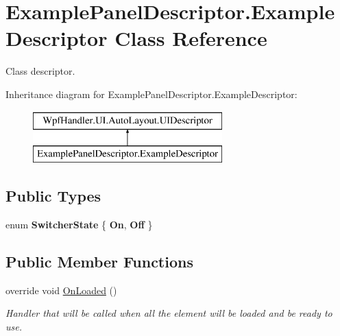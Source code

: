 \hypertarget{class_example_panel_descriptor_1_1_example_descriptor}{}\section{Example\+Panel\+Descriptor.\+Example\+Descriptor Class Reference}
\label{class_example_panel_descriptor_1_1_example_descriptor}


Class descriptor.  


Inheritance diagram for Example\+Panel\+Descriptor.\+Example\+Descriptor\+:\begin{figure}[H]
\begin{center}
\leavevmode
\includegraphics[height=2.000000cm]{d2/d6f/class_example_panel_descriptor_1_1_example_descriptor}
\end{center}
\end{figure}
\subsection*{Public Types}
\begin{DoxyCompactItemize}
\item 
\mbox{\label{class_example_panel_descriptor_1_1_example_descriptor_aa23179dbe0667185d4f11121a9e06fac}} 
enum {\bfseries Switcher\+State} \{ {\bfseries On}, 
{\bfseries Off}
 \}
\end{DoxyCompactItemize}
\subsection*{Public Member Functions}
\begin{DoxyCompactItemize}
\item 
override void \mbox{\hyperlink{class_example_panel_descriptor_1_1_example_descriptor_a242e44f686dc27261ceff4fa514f68d7}{On\+Loaded}} ()
\begin{DoxyCompactList}\small\item\em Handler that will be called when all the element will be loaded and be ready to use. \end{DoxyCompactList}\end{DoxyCompactItemize}
